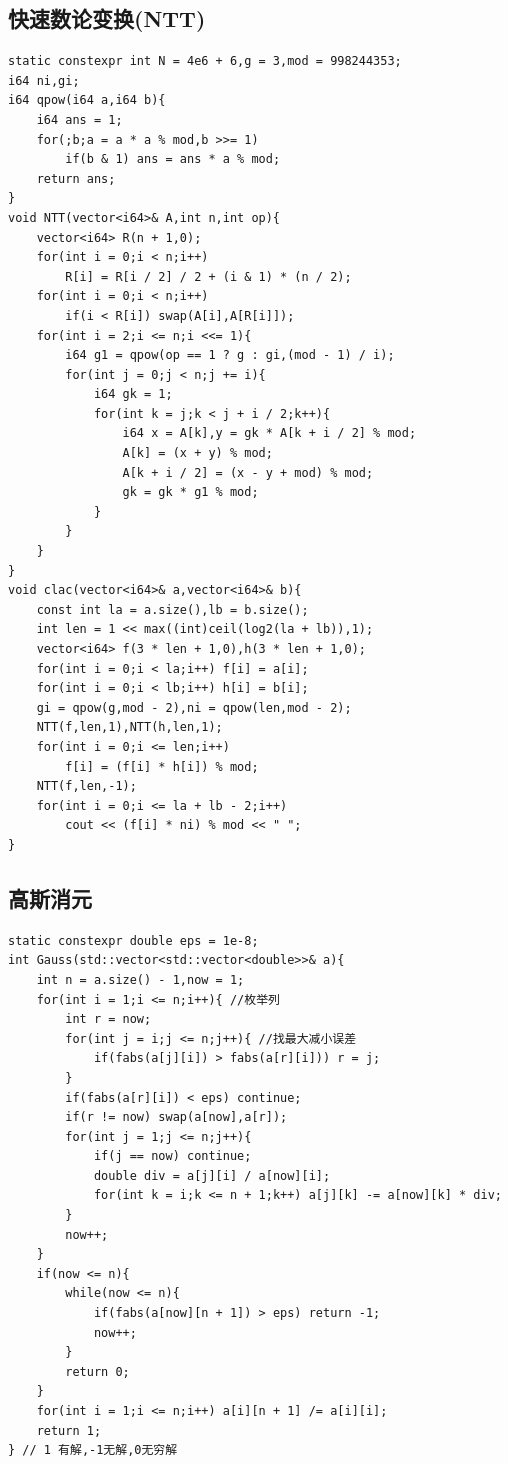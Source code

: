 \subsection{快速数论变换(NTT)}
\begin{lstlisting}[caption={}]
static constexpr int N = 4e6 + 6,g = 3,mod = 998244353;
i64 ni,gi;
i64 qpow(i64 a,i64 b){
    i64 ans = 1;
    for(;b;a = a * a % mod,b >>= 1)
        if(b & 1) ans = ans * a % mod;
    return ans;
}
void NTT(vector<i64>& A,int n,int op){
    vector<i64> R(n + 1,0);
	for(int i = 0;i < n;i++)
		R[i] = R[i / 2] / 2 + (i & 1) * (n / 2);
	for(int i = 0;i < n;i++)
		if(i < R[i]) swap(A[i],A[R[i]]);
	for(int i = 2;i <= n;i <<= 1){
        i64 g1 = qpow(op == 1 ? g : gi,(mod - 1) / i);
        for(int j = 0;j < n;j += i){
            i64 gk = 1;
            for(int k = j;k < j + i / 2;k++){
                i64 x = A[k],y = gk * A[k + i / 2] % mod;
                A[k] = (x + y) % mod;
                A[k + i / 2] = (x - y + mod) % mod;
                gk = gk * g1 % mod;
            }
        }
    }
}
void clac(vector<i64>& a,vector<i64>& b){
    const int la = a.size(),lb = b.size();
	int len = 1 << max((int)ceil(log2(la + lb)),1);
    vector<i64> f(3 * len + 1,0),h(3 * len + 1,0);
	for(int i = 0;i < la;i++) f[i] = a[i];
	for(int i = 0;i < lb;i++) h[i] = b[i];
    gi = qpow(g,mod - 2),ni = qpow(len,mod - 2);
	NTT(f,len,1),NTT(h,len,1);
	for(int i = 0;i <= len;i++) 
        f[i] = (f[i] * h[i]) % mod;
	NTT(f,len,-1);
	for(int i = 0;i <= la + lb - 2;i++) 
        cout << (f[i] * ni) % mod << " ";
}
\end{lstlisting}

\subsection{高斯消元}
\begin{lstlisting}[caption={}]
static constexpr double eps = 1e-8;
int Gauss(std::vector<std::vector<double>>& a){
	int n = a.size() - 1,now = 1;
	for(int i = 1;i <= n;i++){ //枚举列
		int r = now;
		for(int j = i;j <= n;j++){ //找最大减小误差
			if(fabs(a[j][i]) > fabs(a[r][i])) r = j;
		}
		if(fabs(a[r][i]) < eps) continue;
		if(r != now) swap(a[now],a[r]);
		for(int j = 1;j <= n;j++){
			if(j == now) continue;
			double div = a[j][i] / a[now][i];
			for(int k = i;k <= n + 1;k++) a[j][k] -= a[now][k] * div;
		}
		now++;
	}
	if(now <= n){
		while(now <= n){
			if(fabs(a[now][n + 1]) > eps) return -1;
			now++;
		}
		return 0;
	}
	for(int i = 1;i <= n;i++) a[i][n + 1] /= a[i][i];
	return 1;
} // 1 有解,-1无解,0无穷解
\end{lstlisting}

